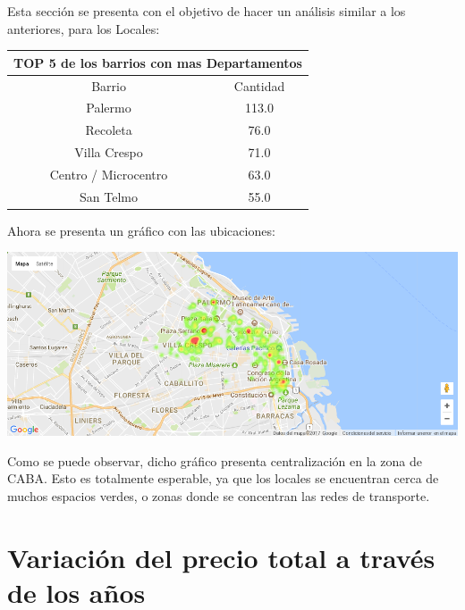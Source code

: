 \documentclass[a4paper, 10pt]{article}
\begin{document}
				Esta sección se presenta con el objetivo de hacer un análisis similar a los anteriores, para los Locales:

				\begin{center}
						\begin{tabular}{ |c|c| }
							\hline
							\multicolumn{2}{|c|}{TOP 5 de los barrios con mas Departamentos}\\
							\hline
							\hline
							Barrio & Cantidad\\
							\hline
							Palermo & 113.0 \\
							Recoleta & 76.0 \\
							Villa Crespo & 71.0 \\
							Centro / Microcentro & 63.0 \\
							San Telmo &	55.0 \\
							\hline
						\end{tabular}
					\end{center}

				Ahora se presenta un gráfico con las ubicaciones:

				\begin{center}
   		    				\includegraphics[width=\textwidth]{images/ubicMLocales}
				\end{center}

				Como se puede observar, dicho gráfico presenta centralización en la zona de CABA.
				Esto es totalmente esperable, ya que los locales se encuentran cerca de muchos espacios verdes, o zonas donde se concentran las redes de transporte.

		\section{Variación del precio total a través de los años}
\end{document}

